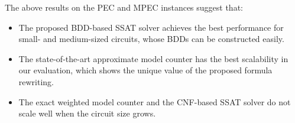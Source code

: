 The above results on the PEC and MPEC instances suggest that:
\begin{itemize}
    \item The proposed BDD-based SSAT solver \bddsp achieves the best performance for small- and medium-sized circuits, whose BDDs can be constructed easily.
    \item The state-of-the-art approximate model counter \approxmc has the best scalability in our evaluation, which shows the unique value of the proposed formula rewriting.
    \item The exact weighted model counter \cachet and the CNF-based SSAT solver \dcssat do not scale well when the circuit size grows.
\end{itemize}
